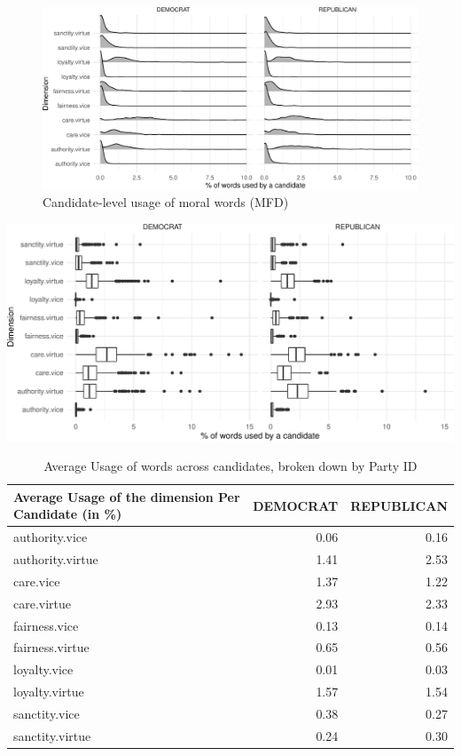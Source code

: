 \documentclass[
  12pt,
]{article}
\begin{document}
\begin{figure}
\centering
\includegraphics{figsFB/unnamed-chunk-22-1.pdf}
\caption{\label{fig:unnamed-chunk-22}Candidate-level usage of moral words (MFD)}
\end{figure}

\includegraphics{figsFB/Candidate-level usage of moral words (MFD)-1.pdf}

\begin{table}

\caption{\label{tab:unnamed-chunk-23}Average Usage of words across candidates, broken down by Party ID}
\centering
\begin{tabular}[t]{lrr}
\toprule
Average Usage of the dimension Per Candidate (in \%) & DEMOCRAT & REPUBLICAN\\
\midrule
authority.vice & 0.06 & 0.16\\
authority.virtue & 1.41 & 2.53\\
care.vice & 1.37 & 1.22\\
care.virtue & 2.93 & 2.33\\
fairness.vice & 0.13 & 0.14\\
\addlinespace
fairness.virtue & 0.65 & 0.56\\
loyalty.vice & 0.01 & 0.03\\
loyalty.virtue & 1.57 & 1.54\\
sanctity.vice & 0.38 & 0.27\\
sanctity.virtue & 0.24 & 0.30\\
\bottomrule
\end{tabular}
\end{table}
\end{document}
